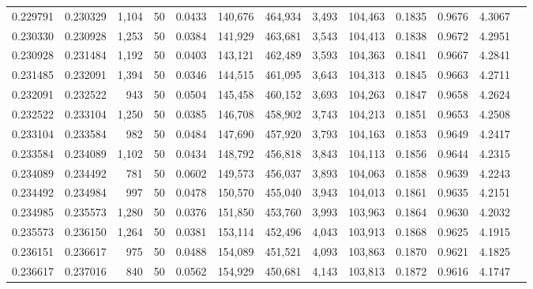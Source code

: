 \begin{tabular}{rrrrrrrrrrrrr}
0.229791 & 0.230329 & 1,104 &  50 &                                     0.0433 & 140,676 & 464,934 &   3,493 & 104,463 & 0.1835 & 0.9676 & 4.3067 \\
0.230330 & 0.230928 & 1,253 &  50 &                                     0.0384 & 141,929 & 463,681 &   3,543 & 104,413 & 0.1838 & 0.9672 & 4.2951 \\
0.230928 & 0.231484 & 1,192 &  50 &                                     0.0403 & 143,121 & 462,489 &   3,593 & 104,363 & 0.1841 & 0.9667 & 4.2841 \\
0.231485 & 0.232091 & 1,394 &  50 &                                     0.0346 & 144,515 & 461,095 &   3,643 & 104,313 & 0.1845 & 0.9663 & 4.2711 \\
0.232091 & 0.232522 &   943 &  50 &                                     0.0504 & 145,458 & 460,152 &   3,693 & 104,263 & 0.1847 & 0.9658 & 4.2624 \\
0.232522 & 0.233104 & 1,250 &  50 &                                     0.0385 & 146,708 & 458,902 &   3,743 & 104,213 & 0.1851 & 0.9653 & 4.2508 \\
0.233104 & 0.233584 &   982 &  50 &                                     0.0484 & 147,690 & 457,920 &   3,793 & 104,163 & 0.1853 & 0.9649 & 4.2417 \\
0.233584 & 0.234089 & 1,102 &  50 &                                     0.0434 & 148,792 & 456,818 &   3,843 & 104,113 & 0.1856 & 0.9644 & 4.2315 \\
0.234089 & 0.234492 &   781 &  50 &                                     0.0602 & 149,573 & 456,037 &   3,893 & 104,063 & 0.1858 & 0.9639 & 4.2243 \\
0.234492 & 0.234984 &   997 &  50 &                                     0.0478 & 150,570 & 455,040 &   3,943 & 104,013 & 0.1861 & 0.9635 & 4.2151 \\
0.234985 & 0.235573 & 1,280 &  50 &                                     0.0376 & 151,850 & 453,760 &   3,993 & 103,963 & 0.1864 & 0.9630 & 4.2032 \\
0.235573 & 0.236150 & 1,264 &  50 &                                     0.0381 & 153,114 & 452,496 &   4,043 & 103,913 & 0.1868 & 0.9625 & 4.1915 \\
0.236151 & 0.236617 &   975 &  50 &                                     0.0488 & 154,089 & 451,521 &   4,093 & 103,863 & 0.1870 & 0.9621 & 4.1825 \\
0.236617 & 0.237016 &   840 &  50 &                                     0.0562 & 154,929 & 450,681 &   4,143 & 103,813 & 0.1872 & 0.9616 & 4.1747 \\

\end{tabular}
